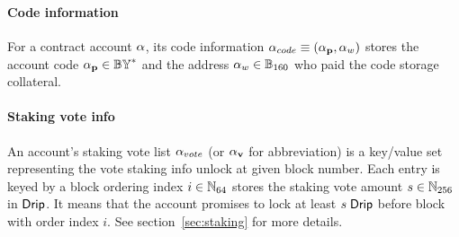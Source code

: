 


\paragraph{Code information}

For a contract account $\mathbf{\alpha}$, its code information $\mathbf{\alpha}_{code}\equiv (\mathbf{\alpha}_{\bf p},\mathbf{\alpha}_{w})$ stores the account code $\mathbf{\alpha}_{\bf p}\in \mathbb{BY}^*$ and the address $\mathbf{\alpha}_{w}\in \mathbb{B}_{160}$ who paid the code storage collateral.

\paragraph{Staking vote info}

An account's staking vote list $\mathbf{\alpha}_{vote}$ (or $\mathbf{\alpha}_{\bf v}$ for abbreviation) is a key/value set representing the vote staking info unlock at given block number. Each entry is keyed by a block ordering index $i\in\mathbb{N}_{64}$ stores the staking vote amount $s\in \mathbb{N}_{256}$ in ${\sf Drip}$. It means that the account promises to lock at least $s\;{\sf Drip}$ before block with order index $i$. See section~\ref{sec:staking} for more details.

